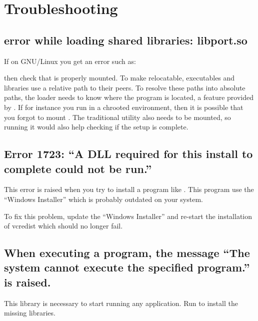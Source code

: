 \section{Troubleshooting}

\subsection{error while loading shared libraries: libport.so}

If on GNU/Linux you get an error such as:


\noindent
then check that  is properly mounted.  To make \usdk
relocatable, executables and libraries use a relative path to their peers.
To resolve these paths into absolute paths, the loader needs to know where
the program is located, a feature provided by .  If for instance
you run \usdk in a chrooted environment, then it is possible that you forgot
to mount .  The traditional \command{ps} utility also needs
\file{/proc} to be mounted, so running it would also help checking if the
setup is complete.


\subsection{Error 1723: ``A DLL required for this install to complete could
  not be run.''}

This error is raised when you try to install a program like
.  This program use the ``Windows Installer''
which is probably outdated on your system.

To fix this problem, update the ``Windows Installer'' and re-start the
installation of vcredist which should no longer fail.

\subsection{When executing a program, the message ``The system cannot
  execute the specified program.'' is raised.}
\label{faq:vcredist:inst}

This library is necessary to start running any application.  Run
\file{vcredist-x86.exe} to install the missing libraries.

